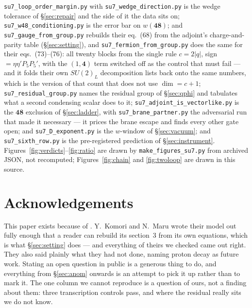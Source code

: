 \documentclass[11pt,a4paper]{article}
\newcommand{\su}[1]{SU(#1)}
\newcommand{\rep}[1]{\mathbf{#1}}
\begin{document}
\texttt{su7\_\allowbreak loop\_\allowbreak order\_\allowbreak margin.py} with \texttt{su7\_\allowbreak wedge\_\allowbreak direction.py} is the wedge
tolerance of \S\ref{sec:repair} and the side of it the data sits on;
\texttt{su7\_\allowbreak w48\_\allowbreak conditioning.py} is the error bar on $w(\rep{48})$; and
\texttt{su7\_\allowbreak gauge\_\allowbreak from\_\allowbreak group.py} rebuilds their eq.~(68) from the adjoint's
charge-and-parity table (\S\ref{sec:setting}), and
\texttt{su7\_\allowbreak fermion\_\allowbreak from\_\allowbreak group.py} does the same for their
eqs.~(73)--(76): all twenty blocks from the single rule $c=2|q|$, sign $=\eta\eta'P_5P_5'$, with the
$(1,\rep4)$ term switched off as the control that must fail --- and it folds their own
$\su2_L$ decomposition lists back onto the same numbers, which is the version of that count
that does not use $\dim=c+1$;
\texttt{su7\_\allowbreak residual\_\allowbreak group.py} names the residual group of
\S\ref{sec:qphi} and tabulates what a second condensing scalar does to it;
\texttt{su7\_\allowbreak adjoint\_\allowbreak is\_\allowbreak vectorlike.py} is the $\rep{48}$
exclusion of \S\ref{sec:ladder}, with \texttt{su7\_\allowbreak brane\_\allowbreak partner.py} the
adversarial run that made it necessary --- it prices the brane escape and finds every other gate
open; and
\texttt{su7\_\allowbreak D\_\allowbreak exponent.py} is the $w$-window of \S\ref{sec:vacuum}; and \texttt{su7\_\allowbreak sixth\_\allowbreak row.py}
is the pre-registered prediction of \S\ref{sec:instrument}. Figures~\ref{fig:verdicts}--\ref{fig:ratio}
are drawn by \texttt{make\_\allowbreak figures\_\allowbreak su7.py} from archived JSON, not recomputed;
Figures~\ref{fig:chain} and \ref{fig:twoloop} are drawn in this source.
\par\endgroup
\fussy

\section*{Acknowledgements}

This paper exists because of \cite{KM25}. Y.~Komori and N.~Maru wrote their model out fully enough
that a reader can rebuild its section~3 from its own equations, which is what \S\ref{sec:setting}
does --- and everything of theirs we checked came out right. They also said plainly what they had not
done, naming proton decay as future work. Stating an open question in public is a generous thing to
do, and everything from \S\ref{sec:anom} onwards is an attempt to pick it up rather than to mark it.
The one column we cannot reproduce is a question of ours, not a finding about them: three
transcription controls pass, and where the residual really sits we do not know.
\end{document}
